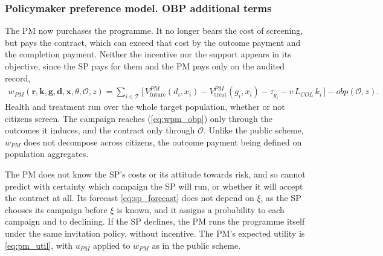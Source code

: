 \documentclass[12pt]{article}
\begin{document}
\subsubsection{Policymaker preference model. OBP additional terms}\label{sec:obp_pm}
The PM now purchases the programme. It no longer bears the cost of screening, but pays the contract, which can exceed that cost by the outcome payment and the completion payment. Neither the incentive nor the support appears in its objective, since the SP pays for them and the PM pays only on the audited record,
\begin{align}\label{eq:wpm_obp}
w_{PM}(\mathbf{r}, \mathbf{k}, \mathbf{g}, \mathbf{d}, \mathbf{x}, \theta, \mathcal{O}, z)
= \sum_{i \in \mathcal{T}} \bigl[\,
    V^{PM}_{\text{future}}(d_i, x_i) - V^{PM}_{\text{treat}}(g_i, x_i) - \tau_{g_i}
  - v\,L_{COL}\,k_i \,\bigr]
  - obp(\mathcal{O}, z).
\end{align}
Health and treatment run over the whole target population, whether or not citizens screen. The campaign reaches (\ref{eq:wpm_obp}) only through the outcomes it induces, and the contract only through $\mathcal{O}$. Unlike the public scheme, $w_{PM}$ does not decompose across citizens, the outcome payment being defined on population aggregates.

The PM does not know the SP's costs or its attitude towards risk, and so cannot predict with certainty which campaign the SP will run, or whether it will accept the contract at all. Its forecast \eqref{eq:sp_forecast} does not depend on $\xi$, as the SP chooses its campaign before $\xi$ is known, and it assigns a probability to each campaign and to declining. If the SP declines, the PM runs the programme itself under the same invitation policy, without incentive. The PM's expected utility is \eqref{eq:pm_util}, with $u_{PM}$ applied to $w_{PM}$ as in the public scheme.
\end{document}
